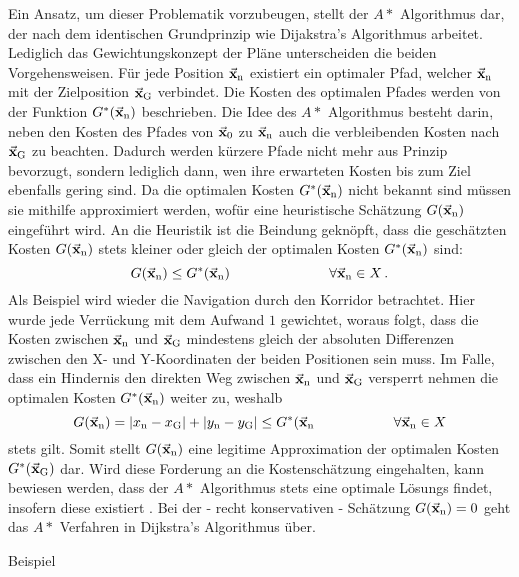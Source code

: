 Ein Ansatz, um dieser Problematik vorzubeugen, stellt der $A*$ Algorithmus dar, der nach dem identischen Grundprinzip wie Dijakstra's Algorithmus arbeitet. Lediglich das Gewichtungskonzept der Pläne unterscheiden die beiden Vorgehensweisen. Für jede Position $\vec{\mathbf{x}}_{\text{n}}$ existiert ein optimaler Pfad, welcher $\vec{\mathbf{x}}_{\text{n}}$ mit der Zielposition $\vec{\mathbf{x}}_{\text{G}}$ verbindet. Die Kosten des optimalen Pfades werden von der Funktion $G^*(\vec{\mathbf{x}}_{\text{n}})$ beschrieben. Die Idee des $A*$ Algorithmus besteht darin, neben den Kosten des Pfades von $\vec{\mathbf{x}}_{\text{0}}$ zu $\vec{\mathbf{x}}_{\text{n}}$ auch die verbleibenden Kosten nach $\vec{\mathbf{x}}_{\text{G}}$ zu beachten. Dadurch werden kürzere Pfade nicht mehr aus Prinzip bevorzugt, sondern lediglich dann, wen ihre erwarteten Kosten bis zum Ziel ebenfalls gering sind. Da die optimalen Kosten $G^*(\vec{\mathbf{x}}_{\text{n}})$ nicht bekannt sind müssen sie mithilfe approximiert werden, wofür eine heuristische Schätzung $G(\vec{\mathbf{x}}_{\text{n}})$ eingeführt wird. An die Heuristik ist die Beindung geknöpft, dass die geschätzten Kosten $G(\vec{\mathbf{x}}_{\text{n}})$ stets kleiner oder gleich der optimalen Kosten $G^*(\vec{\mathbf{x}}_{\text{n}})$ sind:
\begin{equation}
G(\vec{\mathbf{x}}_{\text{n}}) \leq G^*(\vec{\mathbf{x}}_{\text{n}}) \hspace{2.5cm} \forall \vec{\mathbf{x}}_{\text{n}} \in X\,.
\end{equation}
Als Beispiel wird wieder die Navigation durch den Korridor betrachtet. Hier wurde jede Verrückung mit dem Aufwand $1$ gewichtet, woraus folgt, dass die Kosten zwischen $\vec{\mathbf{x}}_{\text{n}}$ und $\vec{\mathbf{x}}_{\text{G}}$ mindestens gleich der absoluten Differenzen zwischen den X- und Y-Koordinaten der beiden Positionen sein muss. Im Falle, dass ein Hindernis den direkten Weg zwischen $\vec{\mathbf{x}}_{\text{n}}$ und $\vec{\mathbf{x}}_{\text{G}}$ versperrt nehmen die optimalen Kosten $G^*(\vec{\mathbf{x}}_{\text{n}})$ weiter zu, weshalb
\begin{equation}
G(\vec{\mathbf{x}}_{\text{n}}) = \vert x_{\text{n}} - x_{\text{G}}\vert + \vert y_{\text{n}} - y_{\text{G}}\vert \leq G^*(\vec{\mathbf{x}}_{\text{n}} \hspace{2cm} \forall \vec{\mathbf{x}}_{\text{n}} \in X
\end{equation}
stets gilt. Somit stellt $G(\vec{\mathbf{x}}_{\text{n}})$ eine legitime Approximation der optimalen Kosten $G^*(\vec{\mathbf{x}}_{\text{G}})$ dar. Wird diese Forderung an die Kostenschätzung eingehalten, kann bewiesen werden, dass der $A*$ Algorithmus stets eine optimale Lösungs findet, insofern diese existiert \cite[S. 32]{PlanAlgo}\cite{SecRef1,SecRef2}. Bei der - recht konservativen - Schätzung $G(\vec{\mathbf{x}}_{\text{n}})=0$ geht das $A*$ Verfahren in Dijkstra's Algorithmus über.

{\color{red} Beispiel}